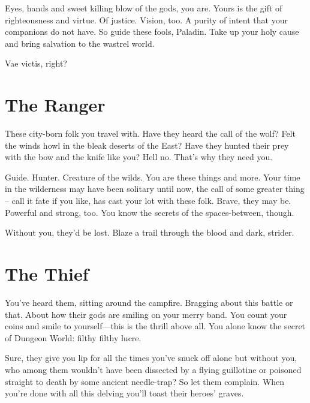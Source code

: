          

Eyes, hands and sweet killing blow of the gods, you are. Yours is the gift of righteousness and virtue. Of justice. Vision, too. A purity of intent that your companions do not have. So guide these fools, Paladin. Take up your holy cause and bring salvation to the wastrel world.

         

Vae victis, right?

         
\section{The Ranger}   
         

These city-born folk you travel with. Have they heard the call of the wolf? Felt the winds howl in the bleak deserts of the East? Have they hunted their prey with the bow and the knife like you? Hell no. That’s why they need you.

         

Guide. Hunter. Creature of the wilds. You are these things and more. Your time in the wilderness may have been solitary until now, the call of some greater thing – call it fate if you like, has cast your lot with these folk. Brave, they may be. Powerful and strong, too. You know the secrets of the spaces-between, though.

         

Without you, they’d be lost. Blaze a trail through the blood and dark, strider.

         
\section{The Thief}   
         

You’ve heard them, sitting around the campfire. Bragging about this battle or that. About how their gods are smiling on your merry band. You count your coins and smile to yourself—this is the thrill above all. You alone know the secret of Dungeon World: filthy filthy lucre.

         

Sure, they give you lip for all the times you’ve snuck off alone but without you, who among them wouldn’t have been dissected by a flying guillotine or poisoned straight to death by some ancient needle-trap? So let them complain. When you’re done with all this delving you’ll toast their heroes' graves.

